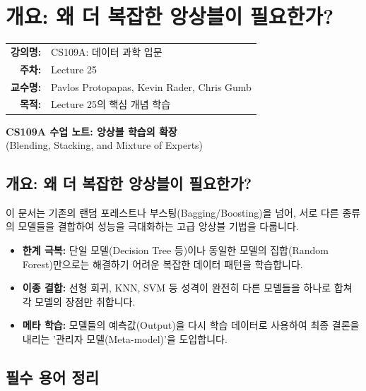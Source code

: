 \documentclass[11pt,a4paper]{book}
\makeatletter
\theoremstyle{definition}
\newcommand{\metainfo}[4]{
\begin{tcolorbox}[
    colback=lightpurple,
    colframe=darkpurple,
    boxrule=1pt,
    arc=2mm,
    left=10pt,
    right=10pt,
    top=8pt,
    bottom=8pt
]
\begin{tabular}{@{}rl@{}}
\textbf{강의명:} & #1 \\[0.3em]
\textbf{주차:} & #2 \\[0.3em]
\textbf{교수명:} & #3 \\[0.3em]
\textbf{목적:} & \begin{minipage}[t]{0.75\textwidth}#4\end{minipage}
\end{tabular}
\end{tcolorbox}
}
\makeatother
\begin{document}
\chapter{개요: 왜 더 복잡한 앙상블이 필요한가?}
\label{ch:lecture25}

\metainfo{CS109A: 데이터 과학 입문}{Lecture 25}{Pavlos Protopapas, Kevin Rader, Chris Gumb}{Lecture 25의 핵심 개념 학습}


\begin{center}
    \LARGE \textbf{CS109A 수업 노트: 앙상블 학습의 확장}\\
    \large (Blending, Stacking, and Mixture of Experts)
\end{center}
\vspace{0.5cm}

\section{개요: 왜 더 복잡한 앙상블이 필요한가?}

이 문서는 기존의 랜덤 포레스트나 부스팅(Bagging/Boosting)을 넘어, 서로 다른 종류의 모델들을 결합하여 성능을 극대화하는 고급 앙상블 기법을 다룹니다.

\begin{summarybox}[title={핵심 목표 및 요약}]
\begin{itemize}
    \item \textbf{한계 극복:} 단일 모델(Decision Tree 등)이나 동일한 모델의 집합(Random Forest)만으로는 해결하기 어려운 복잡한 데이터 패턴을 학습합니다.
    \item \textbf{이종 결합:} 선형 회귀, KNN, SVM 등 성격이 완전히 다른 모델들을 하나로 합쳐 각 모델의 장점만 취합니다.
    \item \textbf{메타 학습:} 모델들의 예측값(Output)을 다시 학습 데이터로 사용하여 최종 결론을 내리는 '관리자 모델(Meta-model)'을 도입합니다.
\end{itemize}
\end{summarybox}

\vspace{0.5cm}

\section{필수 용어 정리}
\end{document}
